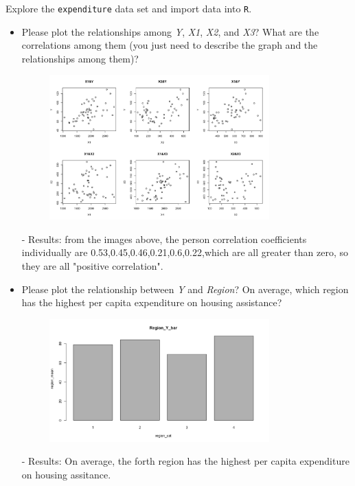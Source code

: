 \documentclass[12pt,letterpaper]{article}
\begin{document}
	\vspace{.5cm}
	\noindent Explore the \texttt{expenditure} data set and import data into \texttt{R}.
	\vspace{.5cm}
	  
	\vspace{.5cm}
	\begin{itemize}
		
		\item
		Please plot the relationships among \emph{Y}, \emph{X1}, \emph{X2}, and \emph{X3}? What are the correlations among them (you just need to describe the graph and the relationships among them)?
		\vspace{.5cm}
		
		  
		\begin{figure}[H]
			\centering
			\includegraphics[width=0.8\textwidth]{daijin1}
		\end{figure}
		\noindent - Results: from the images above, the person correlation coefficients individually are 0.53,0.45,0.46,0.21,0.6,0.22,which are all greater than zero, so they are all "positive correlation".
		\item
		Please plot the relationship between \emph{Y} and \emph{Region}? On average, which region has the highest per capita expenditure on housing assistance?
		
		  
		\begin{figure}[H]
			\centering
			\includegraphics[width=0.8\textwidth]{daijin2}
		\end{figure}
		\noindent - Results: On average, the forth region has the highest per capita expenditure on housing assitance.
		\vspace{.5cm}
		

\end{itemize}
\end{document}
